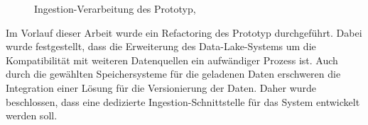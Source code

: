 \begin{figure}
    \centering
    \caption[Ingestion-Verarbeitung des Prototyp]{Ingestion-Verarbeitung des Prototyp, \textcite[Quelle:][S. 3]{prototyp}}
    \label{fig:prototyp-ingestion}
\end{figure}

Im Vorlauf dieser Arbeit wurde ein Refactoring des Prototyp durchgeführt.
Dabei wurde festgestellt, dass die Erweiterung des Data-Lake-Systems um die Kompatibilität mit weiteren Datenquellen ein aufwändiger Prozess ist.
Auch durch die gewählten Speichersysteme für die geladenen Daten erschweren die Integration einer Lösung für die Versionierung der Daten.
Daher wurde beschlossen, dass eine dedizierte Ingestion-Schnittstelle für das System entwickelt werden soll.